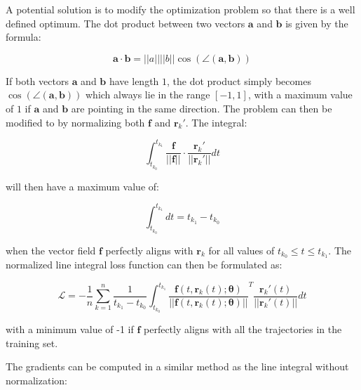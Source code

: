 \documentclass[12pt,a4paper]{book}
\begin{document}
A potential solution is to modify the optimization problem so that there is a well defined optimum. The dot product between two vectors $\bm{a}$ and $\bm{b}$ is given by the formula:

$$
\bm{a} \cdot \bm{b} = ||a|| ||b|| \cos(\angle{(\bm{a}, \bm{b})})
$$

If both vectors $\bm{a}$ and $\bm{b}$ have length $1$, the dot product simply becomes $\cos(\angle{(\bm{a}, \bm{b})})$ which always lie in the range $[-1, 1]$, with a maximum value of $1$ if $\bm{a}$ and $\bm{b}$ are pointing in the same direction. The problem can then be modified to by normalizing both $\bm{f}$ and $\bm{r}_k'$. The integral:

\begin{equation*}
    \int_{t_{k_0}}^{t_{k_1}} \frac{\bm{f}}{|| \bm{f} ||} \cdot \frac{\bm{r}_k'}{|| \bm{r}_k' ||} dt
\end{equation*}

\noindent will then have a maximum value of:

\begin{equation*}
    \int_{t_{k_0}}^{t_{k_1}} dt = t_{k_1} - t_{k_0}
\end{equation*}

\noindent when the vector field $\bm{f}$ perfectly aligns with $\bm{r}_k$ for all values of $t_{k_0} \leq t \leq t_{k_1}$. The normalized line integral loss function can then be formulated as:

\begin{equation}
    \mathcal{L} = - \frac{1}{n} \sum_{k=1}^{n} \frac{1}{t_{k_1} - t_{k_0}} \int_{t_{k_0}}^{t_{k_1}} \frac{\bm{f}(t, \bm{r}_k(t); \bm{\theta})}{|| \bm{f}(t, \bm{r}_k(t); \bm{\theta}) ||} ^T \frac{\bm{r}_k'(t)}{|| \bm{r}_k'(t) ||} dt
    \label{eq:normalizedlineintegral}
\end{equation}

\noindent with a minimum value of -1 if $\bm{f}$ perfectly aligns with all the trajectories in the training set.

The gradients can be computed in a similar method as the line integral without normalization:
\end{document}
